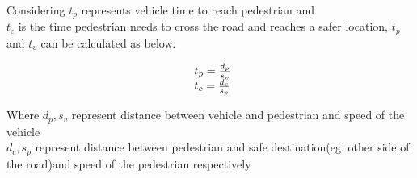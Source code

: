 




Considering ${t_p}$ represents vehicle time to reach pedestrian and \\
${t_c}$ is the time pedestrian needs to cross the road and reaches a safer location,
${t_p}$ and ${t_v}$  can be calculated as below.

\begin{equation}
\begin{array}{l@{}}
  t_p = \frac{d_p}{s_v} \\
	t_c = \frac{d_c}{s_p}
\end{array}
\end{equation}

Where ${d_p},{s_v}$ represent distance between vehicle and pedestrian and speed of the vehicle\\
${d_c}, {s_p}$ represent distance between pedestrian and safe destination(eg. other side of the road)and speed of the pedestrian respectively \\


